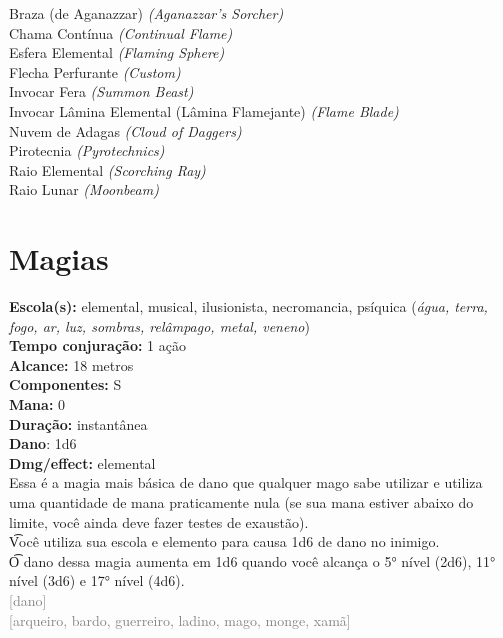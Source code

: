 \documentclass{RPG_Adventure}[2021/10/20]
\begin{document}
{\normalsize Braza (de Aganazzar) \textit{(Aganazzar's Sorcher)}\\ }
{\normalsize Chama Contínua \textit{(Continual Flame)}\\ }
{\normalsize Esfera Elemental \textit{(Flaming Sphere)}\\ }
{\normalsize Flecha Perfurante \textit{(Custom)}\\ }
{\normalsize Invocar Fera \textit{(Summon Beast)}\\ }
{\normalsize Invocar Lâmina Elemental (Lâmina Flamejante) \textit{(Flame Blade)}\\ }
{\normalsize Nuvem de Adagas \textit{(Cloud of Daggers)}\\ }
{\normalsize Pirotecnia \textit{(Pyrotechnics)}\\ }
{\normalsize Raio Elemental \textit{(Scorching Ray)}\\ }
{\normalsize Raio Lunar \textit{(Moonbeam)}\\ }
\jump\chapter{Magias}\n\n{}
{\small \t \textbf{Escola(s):} elemental, musical, ilusionista, necromancia, psíquica (\textit{água, terra, fogo, ar, luz, sombras, relâmpago, metal, veneno})\\\t \textbf{Tempo conjuração:} 1 ação\\\t \textbf{Alcance:} 18 metros\\\t \textbf{Componentes:} S\\\t \textbf{Mana:} 0\\\t \textbf{Duração:} instantânea\\\t \textbf{Dano}: 1d6\\\t \textbf{Dmg/effect:} elemental\\}
{\normalsize Essa é a magia mais básica de dano que qualquer mago sabe utilizar e utiliza uma quantidade de mana praticamente nula (se sua mana estiver abaixo do limite, você ainda deve fazer testes de exaustão).\\\t Você utiliza sua escola e elemento para causa 1d6 de dano no inimigo.\\\t O dano dessa magia aumenta em 1d6 quando você alcança o 5° nível (2d6), 11° nível (3d6) e 17° nível (4d6).\\}
{\scriptsize \textcolor{gray}{[dano]\\}}
{\scriptsize \textcolor{gray}{[arqueiro, bardo, guerreiro, ladino, mago, monge, xamã]\\}}
\end{document}
